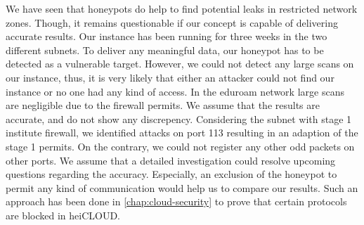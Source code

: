 We have seen that honeypots do help to find potential leaks in restricted network zones.
Though, it remains questionable if our concept is capable of delivering accurate results.
Our instance has been running for three weeks in the two different subnets.
To deliver any meaningful data, our honeypot has to be detected as a vulnerable target.
However, we could not detect any large scans on our instance, thus, it is very likely that either an attacker could not find our instance or no one had any kind of access.
In the eduroam network large scans are negligible due to the firewall permits.
We assume that the results are accurate, and do not show any discrepency.
Considering the subnet with stage 1 institute firewall, we identified attacks on port 113 resulting in an adaption of the stage 1 permits.
On the contrary, we could not register any other odd packets on other ports.
We assume that a detailed investigation could resolve upcoming questions regarding the accuracy.
Especially, an exclusion of the honeypot to permit any kind of communication would help us to compare our results.
Such an approach has been done in \autoref{chap:cloud-security} to prove that certain protocols are blocked in heiCLOUD.
